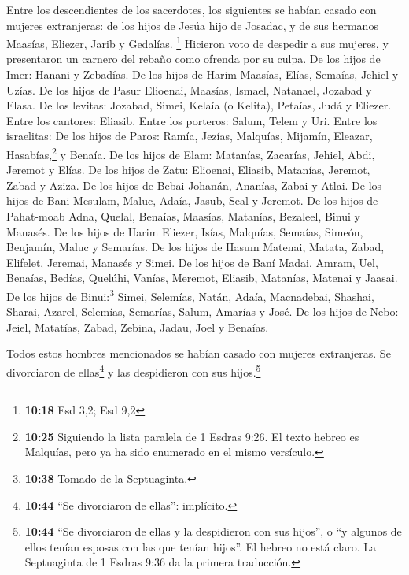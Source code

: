  Entre los descendientes de los sacerdotes, los
siguientes se habían casado con mujeres extranjeras: de los hijos de
Jesúa hijo de Josadac, y de sus hermanos Maasías, Eliezer, Jarib y
Gedalías. \footnote{\textbf{10:18} Esd 3,2; Esd 9,2} 
Hicieron voto de despedir a sus mujeres, y presentaron un carnero del
rebaño como ofrenda por su culpa.  De los hijos de Imer:
Hanani y Zebadías.  De los hijos de Harim Maasías, Elías,
Semaías, Jehiel y Uzías.  De los hijos de Pasur Elioenai,
Maasías, Ismael, Natanael, Jozabad y Elasa.  De los
levitas: Jozabad, Simei, Kelaía (o Kelita), Petaías, Judá y Eliezer.
 Entre los cantores: Eliasib. Entre los porteros: Salum,
Telem y Uri.  Entre los israelitas: De los hijos de
Paros: Ramía, Jezías, Malquías, Mijamín, Eleazar, Hasabías,\footnote{\textbf{10:25}
  Siguiendo la lista paralela de 1 Esdras 9:26. El texto hebreo es
  Malquías, pero ya ha sido enumerado en el mismo versículo.} y Benaía.
 De los hijos de Elam: Matanías, Zacarías, Jehiel, Abdi,
Jeremot y Elías.  De los hijos de Zatu: Elioenai,
Eliasib, Matanías, Jeremot, Zabad y Aziza.  De los hijos
de Bebai Johanán, Ananías, Zabai y Atlai.  De los hijos
de Bani Mesulam, Maluc, Adaía, Jasub, Seal y Jeremot.  De
los hijos de Pahat-moab Adna, Quelal, Benaías, Maasías, Matanías,
Bezaleel, Binui y Manasés.  De los hijos de Harim
Eliezer, Isías, Malquías, Semaías, Simeón,  Benjamín,
Maluc y Semarías.  De los hijos de Hasum Matenai, Matata,
Zabad, Elifelet, Jeremai, Manasés y Simei.  De los hijos
de Baní Madai, Amram, Uel,  Benaías, Bedías, Quelúhi,
 Vanías, Meremot, Eliasib,  Matanías,
Matenai y Jaasai.  De los hijos de Binui:\footnote{\textbf{10:38}
  Tomado de la Septuaginta.} Simei,  Selemías, Natán,
Adaía,  Macnadebai, Shashai, Sharai, 
Azarel, Selemías, Semarías,  Salum, Amarías y José.
 De los hijos de Nebo: Jeiel, Matatías, Zabad, Zebina,
Jadau, Joel y Benaías.

 Todos estos hombres mencionados se habían casado con
mujeres extranjeras. Se divorciaron de ellas\footnote{\textbf{10:44}
  ``Se divorciaron de ellas'': implícito.} y las despidieron con sus
hijos.\footnote{\textbf{10:44} ``Se divorciaron de ellas y la
  despidieron con sus hijos'', o ``y algunos de ellos tenían esposas con
  las que tenían hijos''. El hebreo no está claro. La Septuaginta de 1
  Esdras 9:36 da la primera traducción.}
